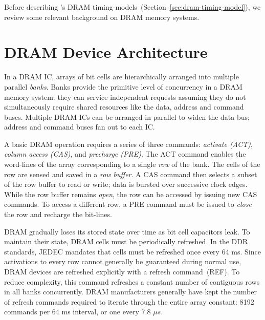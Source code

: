 Before describing \PNAME's DRAM timing-models~(Section~\ref{sec:dram-timing-model}), we review some relevant background
on DRAM memory systems.

\section{DRAM Device Architecture}\label{sec:dram-arch}
In a DRAM IC, arrays of bit cells are hierarchically arranged into multiple
parallel \textit{banks}. Banks provide the primitive level of concurrency in a
DRAM memory system: they can service independent requests assuming they do not
simultaneously require shared resources like the data, address and command
buses.  Multiple DRAM ICs can be arranged in parallel to widen the data bus;
address and command buses fan out to each IC.

A basic DRAM operation requires a series of three commands: \textit{activate (ACT)},
\textit{column access (CAS)}, and \textit{precharge (PRE)}. The ACT command
enables the word-lines of the array corresponding to a single \textit{row} of
the bank. The cells of the row are sensed and saved in a \textit{row
buffer}. A CAS command then selects a subset of the row buffer to
read or write; data is bursted over successive clock edges. While the row
buffer remains \textit{open}, the row can be accessed by issuing new CAS
commands. To access a different row, a PRE command must be
issued to \textit{close} the row and recharge the bit-lines.


DRAM gradually loses its stored state over time as bit cell capacitors leak. To
maintain their state, DRAM cells must be periodically refreshed. In the DDR
standards, JEDEC mandates that cells must be refreshed once every 64
ms. Since activations to every row cannot generally be guaranteed during normal
use, DRAM devices are refreshed explicitly with a refresh command~(REF). To
reduce complexity, this command refreshes a constant number of contiguous rows
in all banks concurrently. DRAM manufacturers generally have kept the number of
refresh commands required to iterate through the entire array constant: 8192
commands per 64 ms interval, or one every 7.8 $\mu s$.
